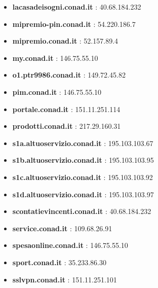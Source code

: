 \documentclass{article}
\begin{document}
\begin{itemize}
            \item \textbf{ lacasadeisogni.conad.it }: 40.68.184.232
        
            \item \textbf{ mipremio-pin.conad.it }: 54.220.186.7
        
            \item \textbf{ mipremio.conad.it }: 52.157.89.4
        
            \item \textbf{ my.conad.it }: 146.75.55.10
        
            \item \textbf{ o1.ptr9986.conad.it }: 149.72.45.82
        
            \item \textbf{ pim.conad.it }: 146.75.55.10
        
            \item \textbf{ portale.conad.it }: 151.11.251.114
        
            \item \textbf{ prodotti.conad.it }: 217.29.160.31
        
            \item \textbf{ s1a.altuoservizio.conad.it }: 195.103.103.67
        
            \item \textbf{ s1b.altuoservizio.conad.it }: 195.103.103.95
        
            \item \textbf{ s1c.altuoservizio.conad.it }: 195.103.103.92
        
            \item \textbf{ s1d.altuoservizio.conad.it }: 195.103.103.97
        
            \item \textbf{ scontatievincenti.conad.it }: 40.68.184.232
        
            \item \textbf{ service.conad.it }: 109.68.26.91
        
            \item \textbf{ spesaonline.conad.it }: 146.75.55.10
        
            \item \textbf{ sport.conad.it }: 35.233.86.30
        
            \item \textbf{ sslvpn.conad.it }: 151.11.251.101
        

\end{itemize}
\end{document}
